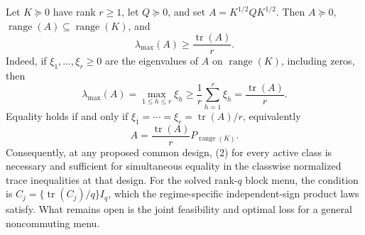 Let \(K\succeq0\) have rank \(r\ge1\), let \(Q\succeq0\), and set \(A=K^{1/2}QK^{1/2}\). Then \(A\succeq0\), \(\operatorname{range}(A)\subseteq\operatorname{range}(K)\), and
\[
\lambda_{\max}(A)\ge \frac{\operatorname{tr}(A)}r. \tag{1}
\]
Indeed, if \(\xi_1,\ldots,\xi_r\ge0\) are the eigenvalues of \(A\) on \(\operatorname{range}(K)\), including zeros, then
\[
\lambda_{\max}(A)=\max_{1\le h\le r}\xi_h
\ge \frac1r\sum_{h=1}^r\xi_h
=\frac{\operatorname{tr}(A)}r.
\]
Equality holds if and only if \(\xi_1=\cdots=\xi_r=\operatorname{tr}(A)/r\), equivalently
\[
A=\frac{\operatorname{tr}(A)}rP_{\operatorname{range}(K)}. \tag{2}
\]
Consequently, at any proposed common design, (2) for every active class is necessary and sufficient for simultaneous equality in the classwise normalized trace inequalities at that design. For the solved rank-\(q\) block menu, the condition is \(C_j=\{\operatorname{tr}(C_j)/q\}I_q\), which the regime-specific independent-sign product laws satisfy. What remains open is the joint feasibility and optimal loss for a general noncommuting menu.